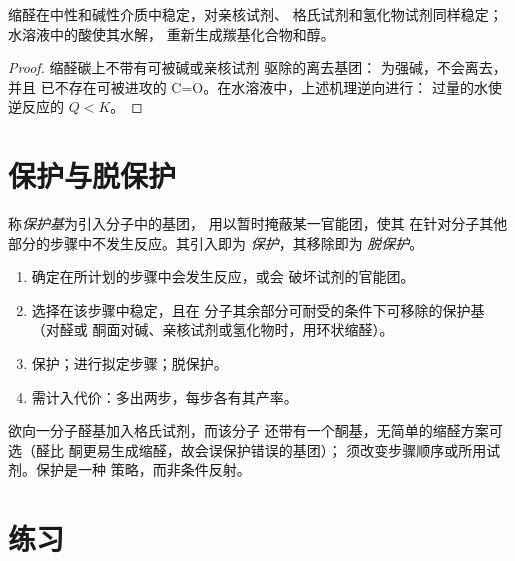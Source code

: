 \begin{proposition}[缩醛的稳定性]\label{prop:b1:acetals-protection:acetal-stability}
缩醛在中性和碱性介质中稳定，对亲核试剂、
格氏试剂和氢化物试剂同样稳定；水溶液中的酸使其水解，
重新生成羰基化合物和醇。
\end{proposition}

\begin{proof}
缩醛碳上不带有可被碱或亲核试剂
驱除的离去基团： 为强碱，不会离去，并且
已不存在可被进攻的 C=O。在水溶液中，上述机理逆向进行：
过量的水使逆反应的 $Q < K$。
\end{proof}

\section{保护与脱保护}

\begin{definition}[保护基]\label{def:b1:acetals-protection:protecting-group}
称\emph{保护基}为引入分子中的基团，
用以暂时掩蔽某一官能团，使其
在针对分子其他部分的步骤中不发生反应。其引入即为
\emph{保护}，其移除即为
\emph{脱保护}。
\end{definition}

\begin{method}[保护、反应、脱保护]\label{met:b1:acetals-protection:protect}
\begin{enumerate}
  \item 确定在所计划的步骤中会发生反应，或会
        破坏试剂的官能团。
  \item 选择在该步骤中稳定，且在
        分子其余部分可耐受的条件下可移除的保护基（对醛或
        酮面对碱、亲核试剂或氢化物时，用环状缩醛）。
  \item 保护；进行拟定步骤；脱保护。
  \item 需计入代价：多出两步，每步各有其产率。
\end{enumerate}
\end{method}

\begin{example}[碍事的酮]\label{ex:b1:acetals-protection:ketoester}
欲向一分子醛基加入格氏试剂，而该分子
还带有一个酮基，无简单的缩醛方案可选（醛比
酮更易生成缩醛，故会误保护错误的基团）；
须改变步骤顺序或所用试剂。保护是一种
策略，而非条件反射。
\end{example}

\section{练习}

